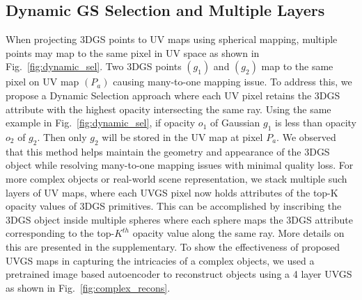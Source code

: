 \subsection{Dynamic GS Selection and Multiple Layers}
When projecting 3DGS points to UV maps using spherical mapping, multiple points may map to the same pixel in UV space as shown in Fig.~\ref{fig:dynamic_sel}. 
Two 3DGS points $( g_1 )$ and $( g_2 )$ map to the same pixel on UV map $( P_a )$ causing many-to-one mapping issue. 
To address this, we propose a Dynamic Selection approach where each UV pixel retains the 3DGS attribute with the highest opacity intersecting the same ray.
Using the same example in Fig.~\ref{fig:dynamic_sel}, if opacity $o_1$ of Gaussian $g_1$ is less than opacity $o_2$ of $g_2$. Then only $g_2$ will be stored in the UV map at pixel $P_a$. 
We observed that this method helps maintain the geometry and appearance of the 3DGS object while resolving many-to-one mapping issues with minimal quality loss.
%
For more complex objects or real-world scene representation, we stack multiple such layers of UV maps, where each UVGS pixel now holds attributes of the top-K opacity values of 3DGS primitives. 
This can be accomplished by inscribing the 3DGS object inside multiple spheres where each sphere maps the 3DGS attribute corresponding to the top-$K^{th}$ opacity value along the same ray. More details on this are presented in the supplementary.
To show the effectiveness of proposed UVGS maps in capturing the intricacies of a complex objects, we used a pretrained image based autoencoder to reconstruct objects using a 4 layer UVGS as shown in Fig.~\ref{fig:complex_recons}. 

